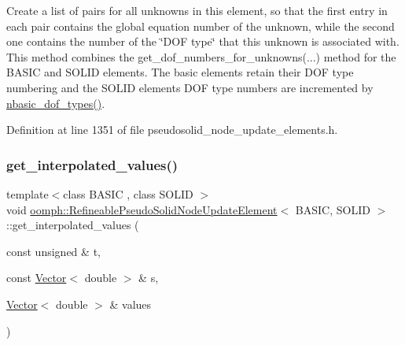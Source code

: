 Create a list of pairs for all unknowns in this element, so that the first entry in each pair contains the global equation number of the unknown, while the second one contains the number of the \char`\"{}\+D\+O\+F type\char`\"{} that this unknown is associated with. This method combines the get\+\_\+dof\+\_\+numbers\+\_\+for\+\_\+unknowns(...) method for the B\+A\+S\+IC and S\+O\+L\+ID elements. The basic elements retain their D\+OF type numbering and the S\+O\+L\+ID elements D\+OF type numbers are incremented by \hyperlink{classoomph_1_1RefineablePseudoSolidNodeUpdateElement_a029f632bdb246c67eb49b7803fd40ab1}{nbasic\+\_\+dof\+\_\+types()}. 



Definition at line 1351 of file pseudosolid\+\_\+node\+\_\+update\+\_\+elements.\+h.

\mbox{\label{classoomph_1_1RefineablePseudoSolidNodeUpdateElement_a0d92d0ec7145da660fdbf5f2a46814fd}} 
\subsubsection{\texorpdfstring{get\+\_\+interpolated\+\_\+values()}{get\_interpolated\_values()}\hspace{0.1cm}{\footnotesize\ttfamily [1/2]}}
{\footnotesize\ttfamily template$<$class B\+A\+S\+IC , class S\+O\+L\+ID $>$ \\
void \hyperlink{classoomph_1_1RefineablePseudoSolidNodeUpdateElement}{oomph\+::\+Refineable\+Pseudo\+Solid\+Node\+Update\+Element}$<$ B\+A\+S\+IC, S\+O\+L\+ID $>$\+::get\+\_\+interpolated\+\_\+values (\begin{DoxyParamCaption}\item[{const unsigned \&}]{t,  }\item[{const \hyperlink{classoomph_1_1Vector}{Vector}$<$ double $>$ \&}]{s,  }\item[{\hyperlink{classoomph_1_1Vector}{Vector}$<$ double $>$ \&}]{values }\end{DoxyParamCaption})\hspace{0.3cm}{\ttfamily [inline]}}




